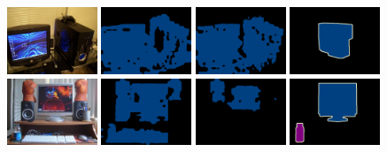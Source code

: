 \begin{figure}[tbhp!]
  {\includegraphics[width=0.24\textwidth]{figures/experiments/pascal/image/0006.jpg}}
  {\includegraphics[width=0.24\textwidth]{figures/experiments/pascal/orgckpt/0006.png}}
  {\includegraphics[width=0.24\textwidth]{figures/experiments/pascal/nonnoisybaseline/0006.png}}
  {\includegraphics[width=0.24\textwidth]{figures/experiments/pascal/gt/2007_000039.png}}
  {\includegraphics[width=0.24\textwidth]{figures/experiments/pascal/image/0014.jpg}}
  {\includegraphics[width=0.24\textwidth]{figures/experiments/pascal/orgckpt/0014.png}}
  {\includegraphics[width=0.24\textwidth]{figures/experiments/pascal/nonnoisybaseline/0014.png}}
  {\includegraphics[width=0.24\textwidth]{figures/experiments/pascal/gt/2007_000559.png}}


\end{figure}
